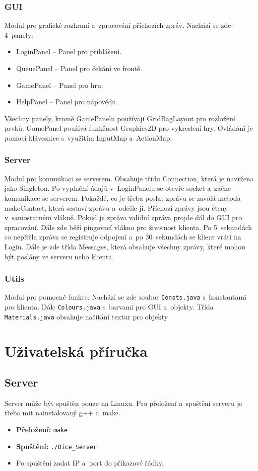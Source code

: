 \documentclass[12pt, a4paper]{article}
\begin{document}
\subsubsection{GUI}
Modul pro grafické rozhraní a~zpracování příchozích zpráv.
Nachází se zde 4~panely:
\begin{itemize}
    \item LoginPanel -- Panel pro přihlášení.
    \item QueuePanel -- Panel pro čekání ve frontě.
    \item GamePanel -- Panel pro hru.
    \item HelpPanel -- Panel pro nápovědu.
\end{itemize}

Všechny panely, kromě GamePanelu používají GridBagLayout pro rozložení prvků.
GamePanel používá funkčnost Graphics2D pro vykreslení hry.
Ovládání je pomocí klávesnice s~využitím InputMap a~ActionMap.

\newpage
\subsubsection{Server}
Modul pro komunikaci se serverem.
Obsahuje třídu Connection, která je navržena jako Singleton.
Po vyplnění údajů v~LoginPanelu se otevře socket a~začne komunikace se serverem.
Pokaždé, co je třeba poslat zprávu se zavolá metoda makeContact, která sestaví zprávu a~odešle ji.
Příchozí zprávy jsou čteny v~samostatném vlákně.
Pokud je zpráva validní zpráva projde dál do GUI pro zpracování.
Dále zde běží pingovací vlákno pro životnost klienta.
Po 5~sekundách co nepřišla zpráva se registruje odpojení a~po 30~sekundách se klient vrátí na Login.
Dále je zde třída Messages, která obsahuje všechny zprávy, které mohou být poslány ze serveru nebo klienta.

\subsubsection{Utils}
Modul pro pomocné funkce.
Nachází se zde soubor \texttt{Consts.java} s~konstantami pro klienta.
Dále \texttt{Colours.java} s~barvami pro GUI a~objekty.
Třída \texttt{Materials.java} obsahuje načítání textur pro objekty

\newpage

\section{Uživatelská příručka}
\subsection{Server}
Server může být spuštěn pouze na Linuxu.
Pro přeložení a~spuštění serveru je třeba mít nainstalovaný g++ a~make.
\begin{itemize}[itemsep=-4pt]
    \item \textbf{Přeložení:} \texttt{make}
    \item \textbf{Spuštění:} \texttt{./Dice\_Server}
    \item Po spuštění zadat IP a~port do příkazové řádky.
\end{itemize}
\end{document}
